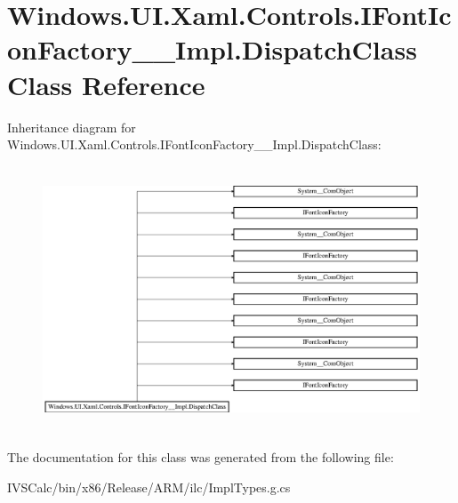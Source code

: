 \hypertarget{class_windows_1_1_u_i_1_1_xaml_1_1_controls_1_1_i_font_icon_factory_____impl_1_1_dispatch_class}{}\section{Windows.\+U\+I.\+Xaml.\+Controls.\+I\+Font\+Icon\+Factory\+\_\+\+\_\+\+Impl.\+Dispatch\+Class Class Reference}
\label{class_windows_1_1_u_i_1_1_xaml_1_1_controls_1_1_i_font_icon_factory_____impl_1_1_dispatch_class}
Inheritance diagram for Windows.\+U\+I.\+Xaml.\+Controls.\+I\+Font\+Icon\+Factory\+\_\+\+\_\+\+Impl.\+Dispatch\+Class\+:\begin{figure}[H]
\begin{center}
\leavevmode
\includegraphics[height=7.938145cm]{class_windows_1_1_u_i_1_1_xaml_1_1_controls_1_1_i_font_icon_factory_____impl_1_1_dispatch_class}
\end{center}
\end{figure}


The documentation for this class was generated from the following file\+:\begin{DoxyCompactItemize}
\item 
I\+V\+S\+Calc/bin/x86/\+Release/\+A\+R\+M/ilc/Impl\+Types.\+g.\+cs\end{DoxyCompactItemize}
